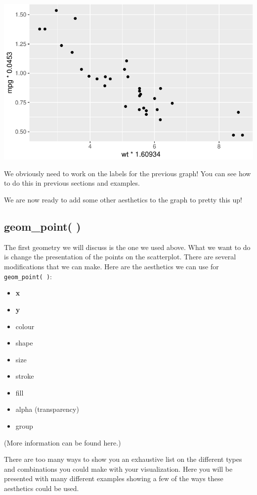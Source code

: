 \documentclass[
  letterpaper,
  DIV=11,
  numbers=noendperiod]{scrreprt}
\begin{document}
\includegraphics{Advanced_Scatterplot_Techniques_files/figure-pdf/unnamed-chunk-4-1.pdf}

We obviously need to work on the labels for the previous graph! You can
see how to do this in previous sections and examples.

We are now ready to add some other aesthetics to the graph to pretty
this up!

\subsection*{geom\_point( )}\label{geom_point}

The first geometry we will discuss is the one we used above. What we
want to do is change the presentation of the points on the scatterplot.
There are several modifications that we can make. Here are the
aesthetics we can use for \texttt{geom\_point(\ )}:

\begin{itemize}
\item
  \textbf{x}
\item
  \textbf{y}
\item
  colour
\item
  shape
\item
  size
\item
  stroke
\item
  fill
\item
  alpha (transparency)
\item
  group
\end{itemize}

(More information can be found here.)

There are too many ways to show you an exhaustive list on the different
types and combinations you could make with your visualization. Here you
will be presented with many different examples showing a few of the ways
these aesthetics could be used.
\end{document}
